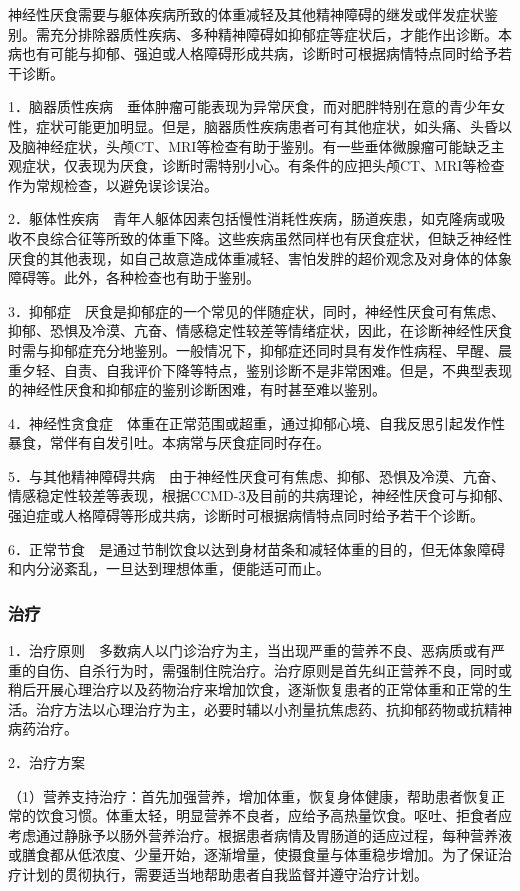 神经性厌食需要与躯体疾病所致的体重减轻及其他精神障碍的继发或伴发症状鉴别。需充分排除器质性疾病、多种精神障碍如抑郁症等症状后，才能作出诊断。本病也有可能与抑郁、强迫或人格障碍形成共病，诊断时可根据病情特点同时给予若干诊断。

1．脑器质性疾病　垂体肿瘤可能表现为异常厌食，而对肥胖特别在意的青少年女性，症状可能更加明显。但是，脑器质性疾病患者可有其他症状，如头痛、头昏以及脑神经症状，头颅CT、MRI等检查有助于鉴别。有一些垂体微腺瘤可能缺乏主观症状，仅表现为厌食，诊断时需特别小心。有条件的应把头颅CT、MRI等检查作为常规检查，以避免误诊误治。

2．躯体性疾病　青年人躯体因素包括慢性消耗性疾病，肠道疾患，如克隆病或吸收不良综合征等所致的体重下降。这些疾病虽然同样也有厌食症状，但缺乏神经性厌食的其他表现，如自己故意造成体重减轻、害怕发胖的超价观念及对身体的体象障碍等。此外，各种检查也有助于鉴别。

3．抑郁症　厌食是抑郁症的一个常见的伴随症状，同时，神经性厌食可有焦虑、抑郁、恐惧及冷漠、亢奋、情感稳定性较差等情绪症状，因此，在诊断神经性厌食时需与抑郁症充分地鉴别。一般情况下，抑郁症还同时具有发作性病程、早醒、晨重夕轻、自责、自我评价下降等特点，鉴别诊断不是非常困难。但是，不典型表现的神经性厌食和抑郁症的鉴别诊断困难，有时甚至难以鉴别。

4．神经性贪食症　体重在正常范围或超重，通过抑郁心境、自我反思引起发作性暴食，常伴有自发引吐。本病常与厌食症同时存在。

5．与其他精神障碍共病　由于神经性厌食可有焦虑、抑郁、恐惧及冷漠、亢奋、情感稳定性较差等表现，根据CCMD-3及目前的共病理论，神经性厌食可与抑郁、强迫症或人格障碍等形成共病，诊断时可根据病情特点同时给予若干个诊断。

6．正常节食　是通过节制饮食以达到身材苗条和减轻体重的目的，但无体象障碍和内分泌紊乱，一旦达到理想体重，便能适可而止。

\subsubsection{治疗}

1．治疗原则　多数病人以门诊治疗为主，当出现严重的营养不良、恶病质或有严重的自伤、自杀行为时，需强制住院治疗。治疗原则是首先纠正营养不良，同时或稍后开展心理治疗以及药物治疗来增加饮食，逐渐恢复患者的正常体重和正常的生活。治疗方法以心理治疗为主，必要时辅以小剂量抗焦虑药、抗抑郁药物或抗精神病药治疗。

2．治疗方案

（1）营养支持治疗：首先加强营养，增加体重，恢复身体健康，帮助患者恢复正常的饮食习惯。体重太轻，明显营养不良者，应给予高热量饮食。呕吐、拒食者应考虑通过静脉予以肠外营养治疗。根据患者病情及胃肠道的适应过程，每种营养液或膳食都从低浓度、少量开始，逐渐增量，使摄食量与体重稳步增加。为了保证治疗计划的贯彻执行，需要适当地帮助患者自我监督并遵守治疗计划。

